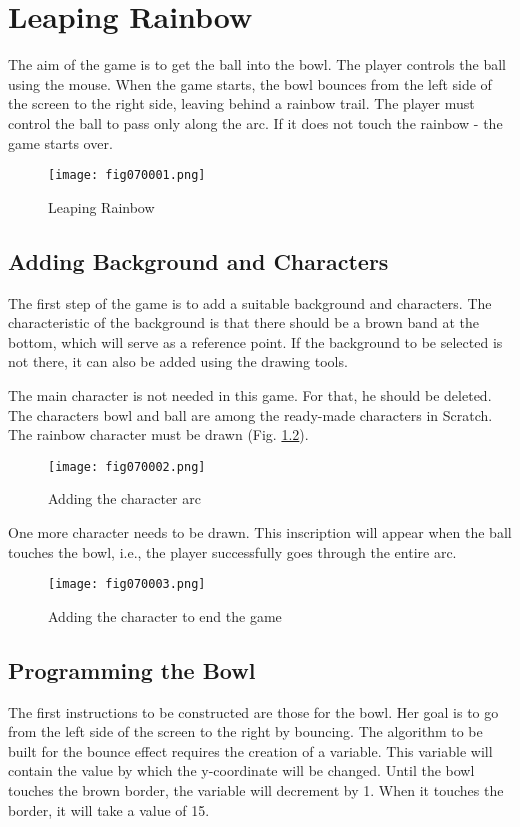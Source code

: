 \chapter{Leaping Rainbow}

The aim of the game is to get the ball into the bowl. The player controls the ball using the mouse. When the game starts, the bowl bounces from the left side of the screen to the right side, leaving behind a rainbow trail. The player must control the ball to pass only along the arc. If it does not touch the rainbow - the game starts over.

\begin{figure}[H]
   \centering
   \texttt{[image: fig070001.png]}
   \caption{Leaping Rainbow}
\label{fig070001}
\end{figure}

\section{Adding Background and Characters}
The first step of the game is to add a suitable background and characters. The characteristic of the background is that there should be a brown band at the bottom, which will serve as a reference point. If the background to be selected is not there, it can also be added using the drawing tools.

The main character is not needed in this game. For that, he should be deleted. The characters bowl and ball are among the ready-made characters in Scratch. The rainbow character must be drawn (Fig. \ref{fig070002}).

\begin{figure}[H]
   \centering
   \texttt{[image: fig070002.png]}
   \caption{Adding the character arc}
\label{fig070002}
\end{figure}

One more character needs to be drawn. This inscription will appear when the ball touches the bowl, i.e., the player successfully goes through the entire arc.

\begin{figure}[H]
   \centering
   \texttt{[image: fig070003.png]}
   \caption{Adding the character to end the game}
\label{fig070003}
\end{figure}

\section{Programming the Bowl}
The first instructions to be constructed are those for the bowl. Her goal is to go from the left side of the screen to the right by bouncing. The algorithm to be built for the bounce effect requires the creation of a variable. This variable will contain the value by which the y-coordinate will be changed. Until the bowl touches the brown border, the variable will decrement by 1. When it touches the border, it will take a value of 15.

